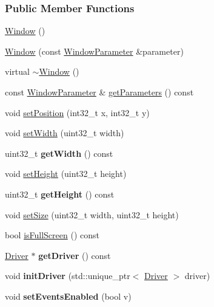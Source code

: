 \subsubsection*{Public Member Functions}
\begin{DoxyCompactItemize}
\item 
\hyperlink{a00082_a6adceceb01e5ed546282c5ea2d09af88}{Window} ()
\item 
\hyperlink{a00082_a3bf48ba460f021664ad27f27509cf473}{Window} (const \hyperlink{a00091}{Window\+Parameter} \&parameter)
\item 
virtual \hyperlink{a00082_a9540302516f5eda30facee89517346ed}{$\sim$\+Window} ()
\item 
const \hyperlink{a00091}{Window\+Parameter} \& \hyperlink{a00082_afbb0f8b825f17fbf8f434c4ab9ae5f8d}{get\+Parameters} () const 
\item 
void \hyperlink{a00082_ad6874b68c5cd0b59ec75ac8ad15f2a3a}{set\+Position} (int32\+\_\+t x, int32\+\_\+t y)
\item 
void \hyperlink{a00082_a3435c3bf0e07492ec77f3977c9b5e355}{set\+Width} (uint32\+\_\+t width)
\item 
uint32\+\_\+t {\bfseries get\+Width} () const \hypertarget{a00082_a8f13b82e3aa16ac711b2efd5411964d0}{}\label{a00082_a8f13b82e3aa16ac711b2efd5411964d0}

\item 
void \hyperlink{a00082_a87b8b6f2c1a08327d4010e2b6aceb319}{set\+Height} (uint32\+\_\+t height)
\item 
uint32\+\_\+t {\bfseries get\+Height} () const \hypertarget{a00082_accdce871efc461fe3348d62f8087b73d}{}\label{a00082_accdce871efc461fe3348d62f8087b73d}

\item 
void \hyperlink{a00082_aefaae1015e22521e0a0168633a7d413f}{set\+Size} (uint32\+\_\+t width, uint32\+\_\+t height)
\item 
bool \hyperlink{a00082_a9429ac0c042cc998ecbedb1c13c0bc9a}{is\+Full\+Screen} () const 
\item 
\hyperlink{a00024}{Driver} $\ast$ {\bfseries get\+Driver} () const \hypertarget{a00082_ac793b7cdbbdd1d62df9dc64e4ed50b27}{}\label{a00082_ac793b7cdbbdd1d62df9dc64e4ed50b27}

\item 
void {\bfseries init\+Driver} (std\+::unique\+\_\+ptr$<$ \hyperlink{a00024}{Driver} $>$ driver)\hypertarget{a00082_a23c30f984006bdf0d2ceda4513ee12b9}{}\label{a00082_a23c30f984006bdf0d2ceda4513ee12b9}

\item 
void {\bfseries set\+Events\+Enabled} (bool v)\hypertarget{a00036_ae529242181c16462bef9bd6b8fb56b93}{}\label{a00036_ae529242181c16462bef9bd6b8fb56b93}


\end{DoxyCompactItemize}
